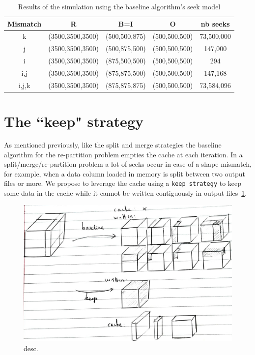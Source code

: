 \documentclass[conference]{IEEEtran}
\begin{document}
\begin{table}[ht]
  \centering
  \caption{Results of the simulation using the baseline algorithm's seek model}

   \begin{tabular}[t]{c c c c c }
   \hline
   Mismatch & R & B=I & O & nb seeks \\
     \hline\hline
     k & (3500,3500,3500) & (500,500,875) & (500,500,500) & 73,500,000 \\
     \hline
     j & (3500,3500,3500) & (500,875,500) & (500,500,500) & 147,000 \\
     \hline
     i & (3500,3500,3500) & (875,500,500) & (500,500,500) & 294 \\
     \hline
     i,j & (3500,3500,3500) & (875,875,500) & (500,500,500) & 147,168 \\
     \hline
     i,j,k & (3500,3500,3500) & (875,875,875) & (500,500,500) & 73,584,096 \\
     \hline
   \end{tabular}

   \label{tab:simseekmodel}

\end{table}

\section{The ``keep" strategy}

As mentioned previously, like the split and merge strategies the baseline
algorithm for the re-partition problem empties the cache at each iteration. In a
split/merge/re-partition problem a lot of seeks occur in case of a shape mismatch,
for example, when a data column loaded in memory is split between two output
files or more. We propose to leverage the cache using a \texttt{keep strategy}
to keep some data in the cache while it cannot be written contiguously in output
files~\ref{fig:keepvsbaseline}.

\begin{figure}[h]
\centering
\includegraphics[scale=0.25]{./figures/new/naive_vs_keep.jpeg}
\caption{desc.}
\label{fig:keepvsbaseline}
\end{figure}
\end{document}
